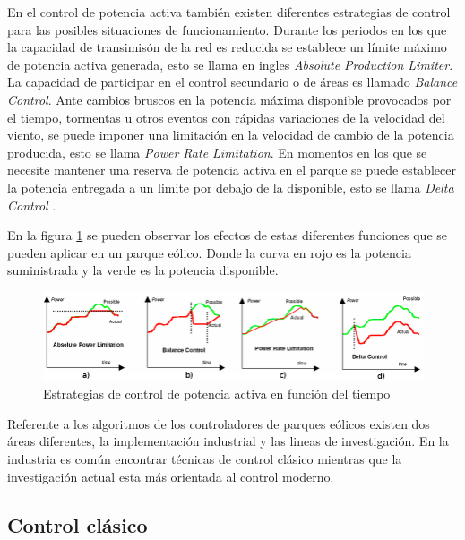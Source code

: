 \documentclass{book}
\begin{document}
En el control de potencia activa tambi\'en existen diferentes estrategias de control para las posibles situaciones de funcionamiento. Durante los periodos en los que la capacidad de transimis\'on de la red es reducida se establece un l\'imite m\'aximo de potencia activa generada, esto se llama en ingles \emph{Absolute Production Limiter}. La capacidad de participar en el control secundario o de \'areas es llamado \emph{Balance Control}. Ante cambios bruscos en la potencia m\'axima disponible provocados por el tiempo, tormentas u otros eventos con r\'apidas variaciones de la velocidad del viento, se puede imponer una limitaci\'on en la velocidad de cambio de la potencia producida, esto se llama \emph{Power Rate Limitation}. En momentos en los que se necesite mantener una reserva de potencia activa en el parque se puede establecer la potencia entregada a un limite por debajo de la disponible, esto se llama \emph{Delta Control}  \cite{ActiveStrategies}. \par

En la figura \ref{PowerLimits} se pueden observar los efectos de estas diferentes funciones que se pueden aplicar en un parque e\'olico. Donde la curva en rojo es la potencia suministrada y la verde es la potencia disponible. \par 


\begin{figure}[h!]
\centering
\includegraphics[width=1\textwidth]{PowerLimits.PNG}
\caption{Estrategias de control de potencia activa en funci\'on del tiempo}
\label{PowerLimits}
\end{figure}

Referente a los algoritmos de los controladores de parques e\'olicos existen dos \'areas diferentes, la implementaci\'on industrial y las lineas de investigaci\'on. En la industria es com\'un encontrar t\'ecnicas de control cl\'asico mientras que la investigaci\'on actual esta m\'as orientada al control moderno. \par 

	\subsection{Control cl\'asico}
\end{document}
